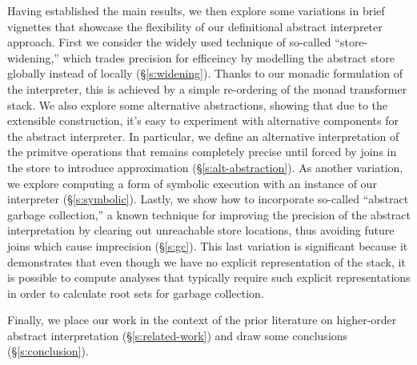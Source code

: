 Having established the main results, we then explore some variations
in brief vignettes that showcase the flexibility of our definitional
abstract interpreter approach.  First we consider the widely used
technique of so-called ``store-widening,'' which trades precision for
efficeincy by modelling the abstract store globally instead of locally
(\S\ref{s:widening}).  Thanks to our monadic formulation of the
interpreter, this is achieved by a simple re-ordering of the monad
transformer stack.  We also explore some alternative abstractions,
showing that due to the extensible construction, it's easy to
experiment with alternative components for the abstract interpreter.
In particular, we define an alternative interpretation of the primitve
operations that remains completely precise until forced by joins in
the store to introduce approximation (\S\ref{s:alt-abstraction}).  As
another variation, we explore computing a form of symbolic execution
with an instance of our interpreter (\S\ref{s:symbolic}).  Lastly, we
show how to incorporate so-called ``abstract garbage collection,'' a
known technique for improving the precision of the abstract
interpretation by clearing out unreachable store locations, thus
avoiding future joins which cause imprecision (\S\ref{s:gc}).  This
last variation is significant because it demonstrates that even though
we have no explicit representation of the stack, it is possible to
compute analyses that typically require such explicit representations
in order to calculate root sets for garbage collection.

Finally, we place our work in the context of the prior literature on
higher-order abstract interpretation (\S\ref{s:related-work}) and draw
some conclusions (\S\ref{s:conclusion}).




